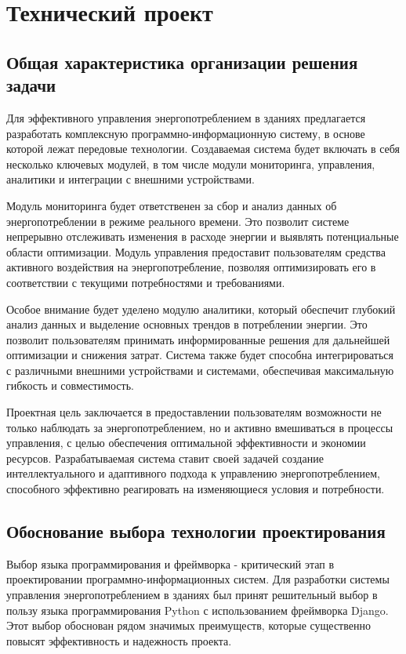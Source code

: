 \section{Технический проект}
\subsection{Общая характеристика организации решения задачи}

Для эффективного управления энергопотреблением в зданиях предлагается разработать комплексную программно-информационную систему, в основе которой лежат передовые технологии. Создаваемая система будет включать в себя несколько ключевых модулей, в том числе модули мониторинга, управления, аналитики и интеграции с внешними устройствами.

Модуль мониторинга будет ответственен за сбор и анализ данных об энергопотреблении в режиме реального времени. Это позволит системе непрерывно отслеживать изменения в расходе энергии и выявлять потенциальные области оптимизации. Модуль управления предоставит пользователям средства активного воздействия на энергопотребление, позволяя оптимизировать его в соответствии с текущими потребностями и требованиями.

Особое внимание будет уделено модулю аналитики, который обеспечит глубокий анализ данных и выделение основных трендов в потреблении энергии. Это позволит пользователям принимать информированные решения для дальнейшей оптимизации и снижения затрат. Система также будет способна интегрироваться с различными внешними устройствами и системами, обеспечивая максимальную гибкость и совместимость.

Проектная цель заключается в предоставлении пользователям возможности не только наблюдать за энергопотреблением, но и активно вмешиваться в процессы управления, с целью обеспечения оптимальной эффективности и экономии ресурсов. Разрабатываемая система ставит своей задачей создание интеллектуального и адаптивного подхода к управлению энергопотреблением, способного эффективно реагировать на изменяющиеся условия и потребности.

\subsection{Обоснование выбора технологии проектирования}

Выбор языка программирования и фреймворка - критический этап в проектировании программно-информационных систем. Для разработки системы управления энергопотреблением в зданиях был принят решительный выбор в пользу языка программирования Python с использованием фреймворка Django. Этот выбор обоснован рядом значимых преимуществ, которые существенно повысят эффективность и надежность проекта.

